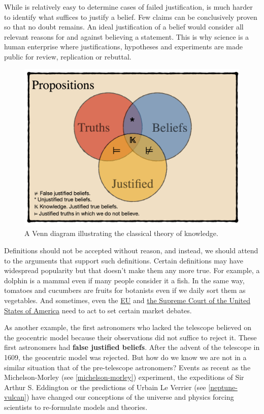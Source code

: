 \documentclass[
]{book}
\begin{document}
While is relatively easy to determine cases of failed justification, is much harder to identify what suffices to justify a belief. Few claims can be conclusively proven so that no doubt remains. An ideal justification of a belief would consider all relevant reasons for and against believing a statement. This is why science is a human enterprise where justifications, hypotheses and experiments are made public for review, replication or rebuttal.

\begin{figure}

{\centering \includegraphics[width=1\linewidth]{Figures/knowledge} 

}

\caption{A Venn diagram illustrating the classical theory of knowledge.}\label{fig:plato-knowledge}
\end{figure}

Definitions should not be accepted without reason, and instead, we should attend to the arguments that support such definitions. Certain definitions may have widespread popularity but that doesn't make them any more true. For example, a dolphin is a mammal even if many people consider it a fish. In the same way, tomatoes and cucumbers are fruits for botanists even if we daily sort them as vegetables. And sometimes, even the \href{https://eur-lex.europa.eu/LexUriServ/LexUriServ.do?uri=CELEX:32001L0113:En:HTML\#d1e32-72-1}{EU} and \href{https://www.nationalgeographic.com/culture/article/fruit-or-vegetable}{the Supreme Court of the United States of America} need to act to set certain market debates.

As another example, the first astronomers who lacked the telescope believed on the geocentric model because their observations did not suffice to reject it. These first astronomers had \textbf{false justified beliefs}. After the advent of the telescope in 1609, the geocentric model was rejected. But how do we know we are not in a similar situation that of the pre-telescope astronomers? Events as recent as the Michelson-Morley (see \ref{michelson-morley}) experiment, the expeditions of Sir Arthur S. Eddington or the predictions of Urbain Le Verrier (see \ref{neptune-vulcan}) have changed our conceptions of the universe and physics forcing scientists to re-formulate models and theories.
\end{document}
